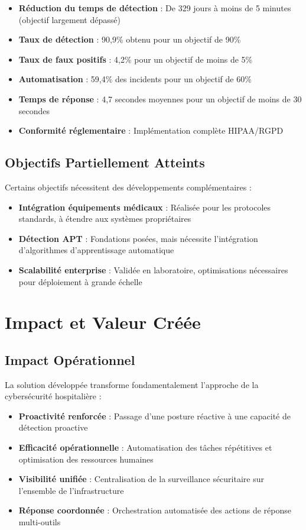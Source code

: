 \begin{itemize}
  \item \cmark \textbf{Réduction du temps de détection} : De 329 jours à moins de 5 minutes (objectif largement dépassé)
  \item \cmark \textbf{Taux de détection} : 90,9\% obtenu pour un objectif de 90\%
  \item \cmark \textbf{Taux de faux positifs} : 4,2\% pour un objectif de moins de 5\%
  \item \cmark \textbf{Automatisation} : 59,4\% des incidents pour un objectif de 60\%
  \item \cmark \textbf{Temps de réponse} : 4,7 secondes moyennes pour un objectif de moins de 30 secondes
  \item \cmark \textbf{Conformité réglementaire} : Implémentation complète HIPAA/RGPD
\end{itemize}

\subsection{Objectifs Partiellement Atteints}

Certains objectifs nécessitent des développements complémentaires :

\begin{itemize}
  \item \warning \textbf{Intégration équipements médicaux} : Réalisée pour les protocoles standards, à étendre aux systèmes propriétaires
  \item \warning \textbf{Détection APT} : Fondations posées, mais nécessite l'intégration d'algorithmes d'apprentissage automatique
  \item \warning \textbf{Scalabilité enterprise} : Validée en laboratoire, optimisations nécessaires pour déploiement à grande échelle
\end{itemize}

\section{Impact et Valeur Créée}

\subsection{Impact Opérationnel}

La solution développée transforme fondamentalement l'approche de la cybersécurité hospitalière :

\begin{itemize}
  \item \textbf{Proactivité renforcée} : Passage d'une posture réactive à une capacité de détection proactive
  \item \textbf{Efficacité opérationnelle} : Automatisation des tâches répétitives et optimisation des ressources humaines
  \item \textbf{Visibilité unifiée} : Centralisation de la surveillance sécuritaire sur l'ensemble de l'infrastructure
  \item \textbf{Réponse coordonnée} : Orchestration automatisée des actions de réponse multi-outils
\end{itemize}

